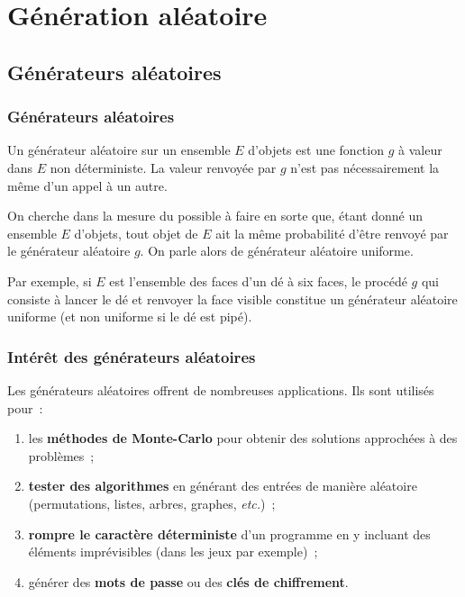 
\section{Génération aléatoire}

\subsection{Générateurs aléatoires}

\begin{frame}[fragile]\frametitle{Générateurs aléatoires}
Un \alert{générateur aléatoire} sur un ensemble $E$ d'objets est une
fonction $g$ à valeur dans $E$ non déterministe. La valeur renvoyée
par $g$ n'est pas nécessairement la même d'un appel à un autre.
\bigskip

On cherche dans la mesure du possible à faire en sorte que, étant
donné un ensemble $E$ d'objets, tout objet de $E$ ait la même probabilité
d'être renvoyé par le générateur aléatoire $g$. On parle alors de
\alert{générateur aléatoire uniforme}.
\bigskip
\bigskip

Par exemple, si $E$ est l'ensemble des faces d'un dé à six faces, le
procédé $g$ qui consiste à lancer le dé et renvoyer la face visible constitue
un générateur aléatoire uniforme (et non uniforme si le dé est pipé).
\end{frame}

\begin{frame}[fragile]\frametitle{Intérêt des générateurs aléatoires}
Les générateurs aléatoires offrent de nombreuses applications. Ils sont
utilisés pour~:
\smallskip

\begin{enumerate}
    \item les {\bf méthodes de Monte-Carlo} pour obtenir des solutions
    approchées à des problèmes~;
    \smallskip

    \item {\bf tester des algorithmes} en générant des entrées de manière
    aléatoire (permutations, listes, arbres, graphes, {\em etc.})~;
    \smallskip

    \item {\bf rompre le caractère déterministe} d'un programme en y
    incluant des éléments imprévisibles (dans les jeux par exemple)~;
    \smallskip

    \item générer des {\bf mots de passe} ou des {\bf clés de chiffrement}.
\end{enumerate}
\end{frame}

